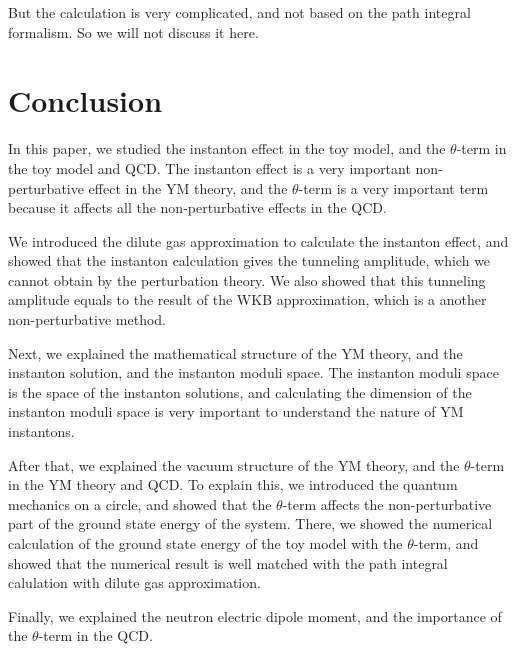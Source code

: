 \documentclass{article}
\begin{document}
But the calculation is very complicated, and not based on the path integral formalism. So we will not discuss it here.

\section{Conclusion}

In this paper, we studied the instanton effect in the toy model, and the $\theta$-term in the toy model and QCD.
The instanton effect is a very important non-perturbative effect in the YM theory, and the $\theta$-term is a very important term because it affects all the non-perturbative effects in the QCD.

We introduced the dilute gas approximation to calculate the instanton effect, and showed that the instanton calculation gives the tunneling amplitude, which we cannot obtain by the perturbation theory.
We also showed that this tunneling amplitude equals to the result of the WKB approximation, which is a another non-perturbative method.

Next, we explained the mathematical structure of the YM theory, and the instanton solution, and the instanton moduli space.
The instanton moduli space is the space of the instanton solutions, and calculating the dimension of the instanton moduli space is very important to understand the nature of YM instantons.

After that, we explained the vacuum structure of the YM theory, and the $\theta$-term in the YM theory and QCD.
To explain this, we introduced the quantum mechanics on a circle, and showed that the $\theta$-term affects the non-perturbative part of the ground state energy of the system.
There, we showed the numerical calculation of the ground state energy of the toy model with the $\theta$-term, and showed that the numerical result is well matched with the path integral calulation with dilute gas approximation.

Finally, we explained the neutron electric dipole moment, and the importance of the $\theta$-term in the QCD.
\end{document}
